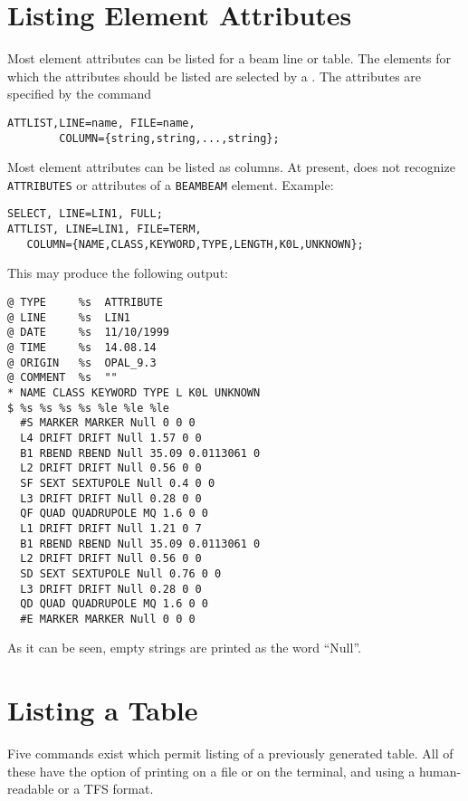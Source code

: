 \section{Listing Element Attributes}
\label{sec:attlist}
Most element attributes can be listed for a beam line or table.
The elements for which the attributes should be listed are selected
by a .
The attributes are specified by the command
\begin{verbatim}
ATTLIST,LINE=name, FILE=name, 
        COLUMN={string,string,...,string};
\end{verbatim}
Most element attributes can be listed as columns.
At present, \opal does not recognize \texttt{ATTRIBUTES} or attributes
of a \texttt{BEAMBEAM} element.
Example:
\begin{verbatim}
SELECT, LINE=LIN1, FULL;
ATTLIST, LINE=LIN1, FILE=TERM,
   COLUMN={NAME,CLASS,KEYWORD,TYPE,LENGTH,K0L,UNKNOWN};
\end{verbatim}
This may produce the following output:
\begin{verbatim}
@ TYPE     %s  ATTRIBUTE
@ LINE     %s  LIN1
@ DATE     %s  11/10/1999
@ TIME     %s  14.08.14
@ ORIGIN   %s  OPAL_9.3
@ COMMENT  %s  ""
* NAME CLASS KEYWORD TYPE L K0L UNKNOWN
$ %s %s %s %s %le %le %le
  #S MARKER MARKER Null 0 0 0
  L4 DRIFT DRIFT Null 1.57 0 0
  B1 RBEND RBEND Null 35.09 0.0113061 0
  L2 DRIFT DRIFT Null 0.56 0 0
  SF SEXT SEXTUPOLE Null 0.4 0 0
  L3 DRIFT DRIFT Null 0.28 0 0
  QF QUAD QUADRUPOLE MQ 1.6 0 0
  L1 DRIFT DRIFT Null 1.21 0 7
  B1 RBEND RBEND Null 35.09 0.0113061 0
  L2 DRIFT DRIFT Null 0.56 0 0
  SD SEXT SEXTUPOLE Null 0.76 0 0
  L3 DRIFT DRIFT Null 0.28 0 0
  QD QUAD QUADRUPOLE MQ 1.6 0 0
  #E MARKER MARKER Null 0 0 0
\end{verbatim}
As it can be seen, empty strings are printed as the word ``Null''.
\clearpage
\section{Listing a Table}
\label{sec:list}
Five commands exist which permit listing of a previously generated
table. 
All of these have the option of printing on a file or on the terminal,
and using a human-readable or a TFS format.


